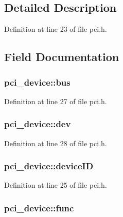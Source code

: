 \subsection{Detailed Description}


Definition at line 23 of file pci.\+h.



\subsection{Field Documentation}
\hypertarget{structpci__device_a832940e219d52a08725a39fc97663d07}{
\subsubsection[{bus}]{ pci\+\_\+device\+::bus}}\label{structpci__device_a832940e219d52a08725a39fc97663d07}


Definition at line 27 of file pci.\+h.

\hypertarget{structpci__device_ae456e0d5fb85c5d367b1a4e27f996b96}{
\subsubsection[{dev}]{ pci\+\_\+device\+::dev}}\label{structpci__device_ae456e0d5fb85c5d367b1a4e27f996b96}


Definition at line 28 of file pci.\+h.

\hypertarget{structpci__device_a86ce8ddd306b0395037ec7eee789a929}{
\subsubsection[{device\+I\+D}]{ pci\+\_\+device\+::device\+I\+D}}\label{structpci__device_a86ce8ddd306b0395037ec7eee789a929}


Definition at line 25 of file pci.\+h.

\hypertarget{structpci__device_ac292358b1097064cb388125a45740aff}{
\subsubsection[{func}]{ pci\+\_\+device\+::func}}\label{structpci__device_ac292358b1097064cb388125a45740aff}



